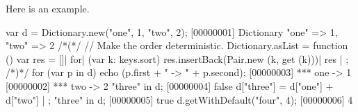 Here is an example.

\begin{urbiscript}
var d = Dictionary.new("one", 1, "two", 2);
[00000001] Dictionary {"one" => 1, "two" => 2}
/*(*/
  // Make the order deterministic.
  Dictionary.asList =
  function ()
  {
    var res = []|
    for| (var k: keys.sort)
      res.insertBack(Pair.new (k, get (k)))|
    res
  } | {};
/*)*/
for (var p in d)
  echo (p.first + " -> " + p.second);
[00000003] *** one -> 1
[00000002] *** two -> 2
"three" in d;
[00000004] false
d["three"] = d["one"] + d["two"] | {};
"three" in d;
[00000005] true
d.getWithDefault("four", 4);
[00000006] 4
\end{urbiscript}

